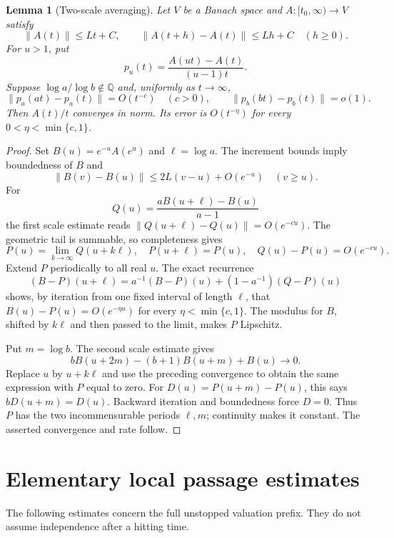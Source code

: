 \documentclass[11pt,a4paper]{article}
\newtheorem{lemma}[theorem]{Lemma}
\begin{document}
\begin{lemma}[Two-scale averaging]\label{lem:ct-two-scale}
Let \(V\) be a Banach space and \(A:[t_0,\infty)\to V\) satisfy
\[
 \|A(t)\|\le Lt+C,\qquad
 \|A(t+h)-A(t)\|\le Lh+C\quad(h\ge0).
\]
For \(u>1\), put
\[
 p_u(t)=\frac{A(ut)-A(t)}{(u-1)t}.
\]
Suppose \(\log a/\log b\notin\mathbb Q\) and, uniformly as
\(t\to\infty\),
\[
 \|p_a(at)-p_a(t)\|=O(t^{-c})\quad(c>0),\qquad
 \|p_b(bt)-p_b(t)\|=o(1).
\]
Then \(A(t)/t\) converges in norm. Its error is
\(O(t^{-\eta})\) for every \(0<\eta<\min\{c,1\}\).
\end{lemma}
\begin{proof}
Set \(B(u)=e^{-u}A(e^u)\) and \(\ell=\log a\).
The increment bounds imply boundedness of \(B\) and
\[
 \|B(v)-B(u)\|\le2L(v-u)+O(e^{-u})\quad(v\ge u).
\]
For
\[
 Q(u)=\frac{aB(u+\ell)-B(u)}{a-1}
\]
the first scale estimate reads
\(\|Q(u+\ell)-Q(u)\|=O(e^{-cu})\).
The geometric tail is summable, so completeness gives
\[
 P(u)=\lim_{k\to\infty}Q(u+k\ell),\quad
 P(u+\ell)=P(u),\quad Q(u)-P(u)=O(e^{-cu}).
\]
Extend \(P\) periodically to all real \(u\). The exact recurrence
\[
 (B-P)(u+\ell)
 =a^{-1}(B-P)(u)+(1-a^{-1})(Q-P)(u)
\]
shows, by iteration from one fixed interval of length \(\ell\),
that \(B(u)-P(u)=O(e^{-\eta u})\) for every
\(\eta<\min\{c,1\}\). The modulus for \(B\), shifted by \(k\ell\)
and then passed to the limit, makes \(P\) Lipschitz.

Put \(m=\log b\). The second scale estimate gives
\[
 bB(u+2m)-(b+1)B(u+m)+B(u)\longrightarrow0.
\]
Replace \(u\) by \(u+k\ell\) and use the preceding convergence to
obtain the same expression with \(P\) equal to zero.
For \(D(u)=P(u+m)-P(u)\), this says \(bD(u+m)=D(u)\).
Backward iteration and boundedness force \(D=0\).
Thus \(P\) has the two incommensurable periods \(\ell,m\);
continuity makes it constant. The asserted convergence and rate follow.
\end{proof}

\section{Elementary local passage estimates}

The following estimates concern the full unstopped valuation prefix.
They do not assume independence after a hitting time.
\end{document}
